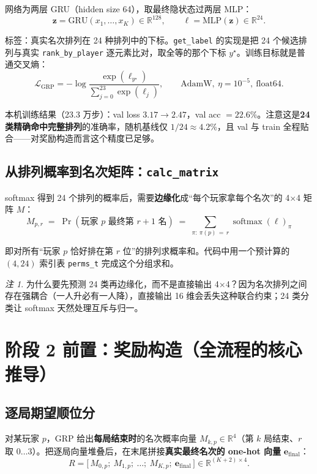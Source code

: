 \documentclass[11pt,a4paper]{ctexart}
\newcommand{\R}{\mathbb{R}}
\DeclareMathOperator{\softmax}{softmax}
\theoremstyle{remark}
\newtheorem*{rem}{注}
\begin{document}
网络为两层 GRU（hidden size 64），取最终隐状态过两层 MLP：
\[
\bm{z} = \mathrm{GRU}(x_1, \dots, x_K) \in \R^{128},\qquad
\bm{\ell} = \mathrm{MLP}(\bm{z}) \in \R^{24}.
\]

标签：真实名次排列在 24 种排列中的下标。\texttt{get\_label} 的实现是把 24 个候选排列与真实 \texttt{rank\_by\_player} 逐元素比对，取全等的那个下标 $y^{\star}$。训练目标就是普通交叉熵：
\[
\mathcal{L}_{\mathrm{GRP}} = -\log \frac{\exp(\ell_{y^{\star}})}{\sum_{j=0}^{23}\exp(\ell_j)},
\qquad \text{AdamW},\ \eta = 10^{-5},\ \text{float64}.
\]

本机训练结果（23.3 万步）：val loss $3.17 \to 2.47$，val acc $= 22.6\%$。注意这是\textbf{24 类精确命中完整排列}的准确率，随机基线仅 $1/24 \approx 4.2\%$，且 val 与 train 全程贴合——对奖励构造而言这个精度已足够。

\subsection{从排列概率到名次矩阵：\texttt{calc\_matrix}}

softmax 得到 24 个排列的概率后，需要\textbf{边缘化}成``每个玩家拿每个名次''的 4$\times$4 矩阵 $M$：
\[
\boxed{\;M_{p,r} \;=\; \Pr(\text{玩家 } p \text{ 最终第 } r{+}1 \text{ 名}) \;=\; \sum_{\pi:\ \pi(p)\,=\,r} \softmax(\bm{\ell})_{\pi}\;}
\]

即对所有``玩家 $p$ 恰好排在第 $r$ 位''的排列求概率和。代码中用一个预计算的 $(4, 24)$ 索引表 \texttt{perms\_t} 完成这个分组求和。

\begin{rem}
为什么要先预测 24 类再边缘化，而不是直接输出 4$\times$4？因为名次排列之间存在强耦合（一人升必有一人降），直接输出 16 维会丢失这种联合约束；24 类分类让 softmax 天然处理互斥与归一。
\end{rem}

\section{阶段 2 前置：奖励构造（全流程的核心推导）}\label{sec:reward}

\subsection{逐局期望顺位分}

对某玩家 $p$，GRP 给出\textbf{每局结束时}的名次概率向量 $M_{k,p} \in \R^4$（第 $k$ 局结束、$r$ 取 $0\dots3$）。把逐局向量堆叠后，在末尾拼接\textbf{真实最终名次的 one-hot 向量} $\bm{e}_{\text{final}}$：
\[
R = \big[\,M_{0,p};\ M_{1,p};\ \dots;\ M_{K,p};\ \bm{e}_{\text{final}}\,\big] \in \R^{(K+2)\times 4}.
\]
\end{document}
